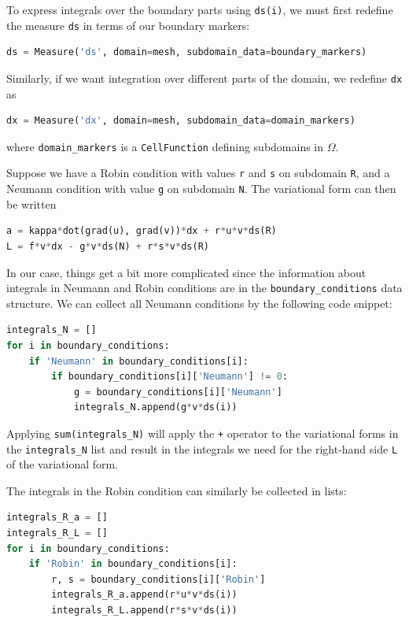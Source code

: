 \documentclass[graybox,envcountchap,sectrefs,final]{svmonodo}
\begin{document}
To express integrals over the boundary parts using \texttt{ds(i)}, we must
first redefine the measure \texttt{ds} in terms of our boundary markers:

\begin{lstlisting}[language=Python,style=graycolor]
ds = Measure('ds', domain=mesh, subdomain_data=boundary_markers)
\end{lstlisting}
Similarly, if we want integration over different parts of the domain,
we redefine \texttt{dx} as

\begin{lstlisting}[language=Python,style=graycolor]
dx = Measure('dx', domain=mesh, subdomain_data=domain_markers)
\end{lstlisting}
where \Verb!domain_markers! is a \texttt{CellFunction} defining subdomains in $\Omega$.

Suppose we have a Robin condition with values \texttt{r} and \texttt{s} on subdomain
\texttt{R}, and a Neumann condition with value \texttt{g} on subdomain \texttt{N}. The
variational form can then be written

\begin{lstlisting}[language=Python,style=graycolor]
a = kappa*dot(grad(u), grad(v))*dx + r*u*v*ds(R)
L = f*v*dx - g*v*ds(N) + r*s*v*ds(R)
\end{lstlisting}

In our case, things get a bit more complicated since the
information about integrals in Neumann and Robin conditions
are in the \Verb!boundary_conditions! data structure. We can collect
all Neumann conditions by the following code snippet:

\begin{lstlisting}[language=Python,style=graycolor]
integrals_N = []
for i in boundary_conditions:
    if 'Neumann' in boundary_conditions[i]:
        if boundary_conditions[i]['Neumann'] != 0:
            g = boundary_conditions[i]['Neumann']
            integrals_N.append(g*v*ds(i))
\end{lstlisting}
Applying \Verb!sum(integrals_N)! will apply the \texttt{+} operator to
the variational forms in the \Verb!integrals_N! list and result
in the integrals we need for the right-hand side \texttt{L} of the
variational form.

The integrals in the Robin condition can similarly be collected
in lists:

\begin{lstlisting}[language=Python,style=graycolor]
integrals_R_a = []
integrals_R_L = []
for i in boundary_conditions:
    if 'Robin' in boundary_conditions[i]:
        r, s = boundary_conditions[i]['Robin']
        integrals_R_a.append(r*u*v*ds(i))
        integrals_R_L.append(r*s*v*ds(i))
\end{lstlisting}
\end{document}

